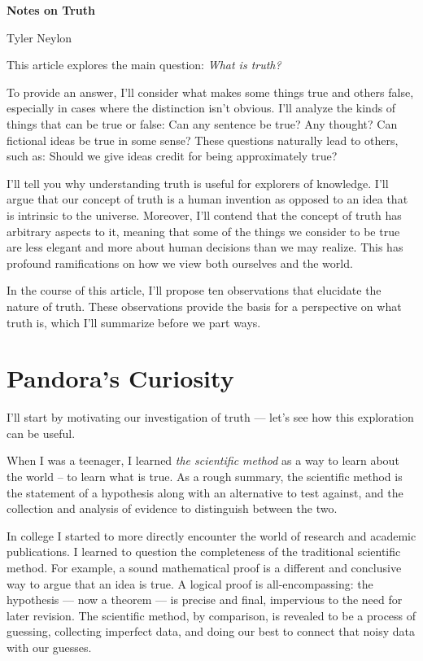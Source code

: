 \documentclass[11pt, oneside]{article}
\begin{document}
{\bf Notes on Truth}

Tyler Neylon

\bigskip

This article explores the main question: {\em What is truth?}

To provide an answer, I'll consider what makes some things true and
others false, especially in cases where the distinction isn't obvious.
I'll analyze the kinds of things that can be true or false:
Can any sentence be true? Any thought?
Can fictional ideas be true in some sense?
These questions naturally lead to others, such
as:
Should we give ideas credit for being approximately true?

I'll tell you why understanding truth is useful for explorers of
knowledge.
I'll argue that our concept of truth is a human invention as opposed to an idea
that is intrinsic to the universe.
Moreover, I'll contend
that the concept of truth has arbitrary aspects to it, meaning that some of
the things we consider to be true are less elegant and more about human
decisions than
we may realize. This has profound ramifications on how we
view both ourselves and the world.

In the course of this article, I'll propose ten
observations that elucidate the nature of truth.
These observations provide the basis for a
perspective on what truth is, which I'll summarize
before we part ways.

\section{Pandora's Curiosity}

I'll start by motivating our investigation of truth ---
let's see how this exploration can be useful.

When I was a teenager, I learned {\em the scientific method} as a way to
learn about the world -- to learn what is true.
As a rough summary,
the scientific method is the statement
of a hypothesis along with an alternative to test against, and
the collection and analysis of evidence to distinguish between
the two.

In college
I started to more directly encounter the world of research
and academic publications.
I learned to question the completeness of the traditional scientific method.
For example, a sound mathematical proof is a different and
conclusive way
to argue that an idea is true.
A logical proof is all-encompassing: the hypothesis --- now a theorem
--- is
precise and final,
impervious to the need for later revision.
The scientific method, by comparison, is revealed to be
a process of guessing, collecting imperfect data, and doing our best to
connect that noisy data with our guesses.
\end{document}
